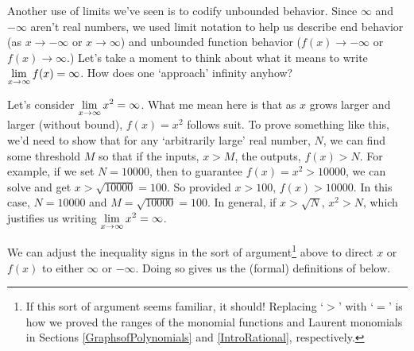 \documentclass{ximera}
\begin{document}
Another use of limits we've seen is to codify unbounded behavior.  Since $\infty$ and $-\infty$ aren't real numbers,  we used limit notation to help us describe end behavior  (as $x \rightarrow - \infty$ or $x \rightarrow \infty$) and unbounded function behavior ($f(x)\rightarrow -\infty$ or $f(x) \rightarrow \infty$.)  Let's take a moment to think about what it means to write $\ds{\lim_{x \rightarrow \infty} f(x) = \infty}$.  How does one `approach' infinity anyhow?  

\medskip

Let's consider  $\ds{\lim_{x \rightarrow \infty} x^2 = \infty}$.  What me mean here is that as $x$ grows larger and larger (without bound), $f(x) = x^2$ follows suit.  To prove something like this, we'd need to show that for any `arbitrarily large' real number, $N$, we can find some threshold $M$ so that if the inputs, $x>M$, the outputs, $f(x) > N$.  For example, if we set $N = 10000$, then to guarantee $f(x) = x^2 > 10000$, we can solve and get $x > \sqrt{10000} = 100$.  So provided $x > 100$, $f(x) > 10000$.  In this case, $N = 10000$ and $M = \sqrt{10000} = 100$.  In general, if $x > \sqrt{N}$, $x^2 > N$, which justifies us writing $\ds{\lim_{x \rightarrow \infty} x^2 = \infty}$.

\medskip

We can adjust the inequality signs in the sort of argument\footnote{If this sort of argument seems familiar, it should!  Replacing `$>$' with `$=$' is how we proved the ranges  of the monomial functions and Laurent monomials  in Sections \ref{GraphsofPolynomials} and \ref{IntroRational}, respectively.}   above to direct $x$ or $f(x)$ to either $\infty$ or $-\infty$.  Doing so gives us the (formal) definitions of below.

\medskip
\end{document}
